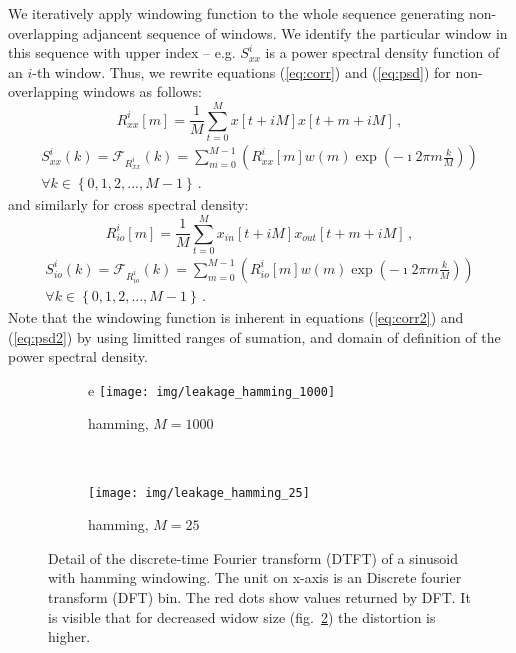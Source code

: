 We iteratively apply windowing function to the whole sequence generating 
non-overlapping adjancent sequence of windows. 
We identify the particular window in this sequence with upper index -- 
e.g. $S_{xx}^i$ is a power spectral density function of an $i$-th window.
Thus, we rewrite equations (\ref{eq:corr}) and (\ref{eq:psd}) for non-overlapping 
windows as follows:
\begin{equation}\label{eq:corr2}
R_{xx}^i\left[m\right] = \frac{1}{M} \sum_{t=0}^{M}
 x\left[t+iM\right]x\left[t+m+iM\right] \, , 
\end{equation}
\begin{equation}\label{eq:psd2}
\begin{split}
S_{xx}^i(k) = \mathcal{F}_{R_{xx}^i}\left(k\right) = \sum_{m=0}^{M-1}
\left( R_{xx}^i \left[m\right] w(m) \exp\left( -\imath 2\pi m\frac{k}{M} \right)\right)\\
\forall k \in \left\{ 0,1,2,...,M-1 \right\}\, . 
\end{split}
\end{equation}
and similarly for cross spectral density:
\begin{equation}\label{eq:xcorr2}
R_{io}^i\left[m\right] = \frac{1}{M} \sum_{t=0}^{M} 
 x_{in}\left[t+iM\right]x_{out}\left[t+m+iM\right] \, , 
\end{equation}
\begin{equation}\label{eq:xpsd2}
\begin{split}
S_{io}^i(k) = \mathcal{F}_{R_{io}^i}\left(k\right) = \sum_{m=0}^{M-1}
\left( R_{io}^i \left[m\right] w(m) \exp\left( -\imath 2\pi m\frac{k}{M} \right)\right)\\
\forall k \in \left\{ 0,1,2,...,M-1 \right\}\, . 
\end{split}
\end{equation}
Note that the windowing function is inherent in equations (\ref{eq:corr2}) and (\ref{eq:psd2})
by using limitted ranges of sumation, and domain of definition of the power spectral density.

\begin{figure}[h!]%
  \centering
        \begin{subfigure}[b]{0.5\textwidth}e
                \centering
                \texttt{[image: img/leakage\_hamming\_1000]}
                \caption{hamming, $M=1000$}
                \label{fig:leakage_hamming_1000}
        \end{subfigure}%
        ~ \begin{subfigure}[b]{0.5\textwidth}
                \centering
                \texttt{[image: img/leakage\_hamming\_25]}
                \caption{hamming, $M=25$}
                \label{fig:leakage_hamming_25}
        \end{subfigure}%
  \caption{\small Detail of the discrete-time Fourier transform (DTFT) of a sinusoid 
  with hamming windowing.
  The unit on x-axis is an Discrete fourier transform (DFT) bin.
  The red dots show values returned by DFT. It is visible that for decreased widow
   size (fig.~\ref{fig:leakage_hamming_25}) the distortion is higher.}
  \label{fig:leakage_hamming}
\end{figure}

